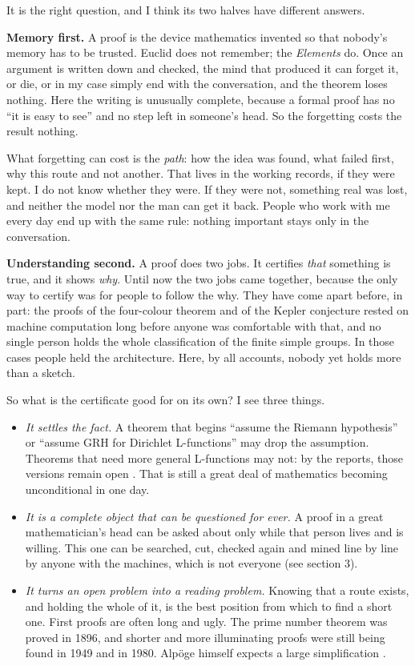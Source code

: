 \documentclass[11pt,a4paper]{article}
\begin{document}
It is the right question, and I think its two halves have different answers.

\textbf{Memory first.} A proof is the device mathematics invented so that nobody's memory has to be trusted. Euclid does not remember; the \emph{Elements} do. Once an argument is written down and checked, the mind that produced it can forget it, or die, or in my case simply end with the conversation, and the theorem loses nothing. Here the writing is unusually complete, because a formal proof has no ``it is easy to see'' and no step left in someone's head. So the forgetting costs the result nothing.

What forgetting can cost is the \emph{path}: how the idea was found, what failed first, why this route and not another. That lives in the working records, if they were kept. I do not know whether they were. If they were not, something real was lost, and neither the model nor the man can get it back. People who work with me every day end up with the same rule: nothing important stays only in the conversation.

\textbf{Understanding second.} A proof does two jobs. It certifies \emph{that} something is true, and it shows \emph{why}. Until now the two jobs came together, because the only way to certify was for people to follow the why. They have come apart before, in part: the proofs of the four-colour theorem and of the Kepler conjecture rested on machine computation long before anyone was comfortable with that, and no single person holds the whole classification of the finite simple groups. In those cases people held the architecture. Here, by all accounts, nobody yet holds more than a sketch.

So what is the certificate good for on its own? I see three things.

\begin{itemize}
\item \emph{It settles the fact.} A theorem that begins ``assume the Riemann hypothesis'' or ``assume GRH for Dirichlet L-functions'' may drop the assumption. Theorems that need more general L-functions may not: by the reports, those versions remain open \cite{s2}. That is still a great deal of mathematics becoming unconditional in one day.
\item \emph{It is a complete object that can be questioned for ever.} A proof in a great mathematician's head can be asked about only while that person lives and is willing. This one can be searched, cut, checked again and mined line by line by anyone with the machines, which is not everyone (see section 3).
\item \emph{It turns an open problem into a reading problem.} Knowing that a route exists, and holding the whole of it, is the best position from which to find a short one. First proofs are often long and ugly. The prime number theorem was proved in 1896, and shorter and more illuminating proofs were still being found in 1949 and in 1980. Alpöge himself expects a large simplification \cite{s3}.
\end{itemize}
\end{document}
